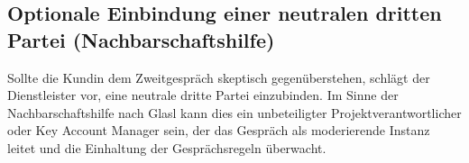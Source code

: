 \subsection{Optionale Einbindung einer neutralen dritten Partei (Nachbarschaftshilfe)}
Sollte die Kundin dem Zweitgespräch skeptisch gegenüberstehen, schlägt der Dienstleister vor, eine neutrale dritte Partei einzubinden. Im Sinne der Nachbarschaftshilfe nach Glasl kann dies ein unbeteiligter Projektverantwortlicher oder Key Account Manager sein, der das Gespräch als moderierende Instanz leitet und die Einhaltung der Gesprächsregeln überwacht.

